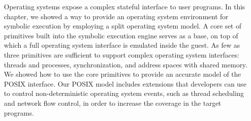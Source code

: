 Operating systems expose a complex stateful interface to user programs.
%
In this chapter, we showed a way to provide an operating system environment for symbolic execution by employing a split operating system model.  A core set of primitives built into the symbolic execution engine serves as a base, on top of which a full operating system interface is emulated inside the guest.
%
As few as three primitives are sufficient to support complex operating system interfaces: threads and processes, synchronization, and address spaces with shared memory.
%
%
We showed how to use the core primitives to provide an accurate model of the POSIX interface.
%
Our POSIX model includes extensions that developers can use to control non-deterministic operating system events, such as thread scheduling and network flow control, in order to increase the coverage in the target programs.

